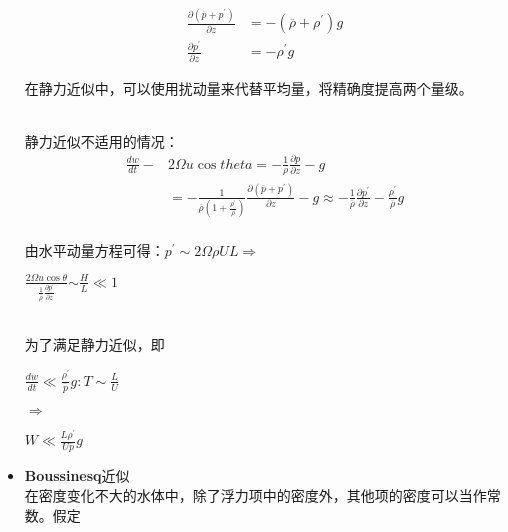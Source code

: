 \documentclass[cn, twoside]{myModel}
\begin{document}
\begin{itemize}
\begin{minipage}{6cm}
			    	\raggedright
			    	\begin{equation*}
			    		\begin{split}
			    			\frac{\partial(\overline{p}+p^{\prime})}{\partial z}&=-(\overline{\rho}+\rho^{\prime})g \\
			    			\frac{\partial p^{\prime}}{\partial z}&=-\rho^{\prime}g
			    		\end{split}
			    	\end{equation*}
			    \end{minipage}
			    \begin{minipage}{8cm}
			    	\centering
			    	在静力近似中，可以使用扰动量来代替平均量，将精确度提高两个量级。
			    \end{minipage} \\ [.3em]
			    静力近似不适用的情况：
			    \begin{equation*} 
			   		\begin{split}
			   			\frac{dw}{dt}-&2\Omega{u}\cos{theta}=-\frac{1}{\rho}\frac{\partial p}{\partial z}-g \\
			   			&=-\frac{1}{\overline{\rho}(1+\frac{\rho^{\prime}}{\overline{\rho}})}\frac{\partial (\overline{p}+p^{\prime})}{\partial z}-g\approx-\frac{1}{\overline{\rho}}\frac{\partial p^{\prime}}{\partial z}-\frac{\rho^{\prime}}{\overline{\rho}}g
			   		\end{split}
			   	\end{equation*}\\
			   	由水平动量方程可得：\textcolor{violet!70!black}{$p^{\prime}\sim2\Omega\rho{UL}$}$\Rightarrow$
			   	\begin{minipage}{5cm}
			   		\raggedright\Large
			   		$\frac{2\Omega{u}\cos{\theta}}{\frac{1}{\overline{\rho}}\frac{\partial p^{\prime}}{\partial z}}$$\sim$$\frac{H}{L}\ll1$
			   	\end{minipage} \\ [.3em]	
			   	为了满足静力近似，即
			   	\begin{minipage}{3.4cm}
			   	\raggedright
			   		$\frac{dw}{dt}\ll\frac{\rho^{\prime}}{\overline{p}}g:T\sim\frac{L}{U}$
			   	\end{minipage} $\Rightarrow$
			   	\begin{minipage}{5cm}
			   	\raggedright
			   		\textcolor{blue!70!black}{$W\ll\frac{L\rho^{\prime}}{U\overline{p}}g$}
			   	\end{minipage}
			   	\item \textbf{Boussinesq}近似 \\
			   		在密度变化不大的水体中，除了浮力项中的密度外，其他项的密度可以当作常数。假定

\end{itemize}
\end{document}
